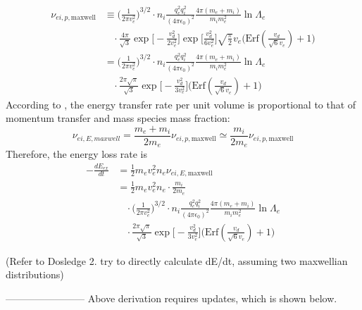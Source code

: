 \documentclass{article}
\begin{document}
\begin{equation}
	\begin{split}
		\nu_{ei,p,\text{maxwell}} &\equiv \Big(\frac{1}{2\pi v_e^2} \Big)^{3/2} \cdot n_i\frac{q_e^2 q_i^2}{(4\pi \epsilon_0 )^2}\frac{4\pi(m_e+m_i)}{m_i m_e^2} \ln \Lambda_e \\
		 &\ \ \ \ \cdot \frac{4\pi}{\sqrt{3}} \exp\Big[-\frac{v_d^2}{2v_e^2} \Big] \exp\Big[\frac{v_d^2}{6v_e^2} \Big]\sqrt{\frac{\pi}{2}}v_e \Big(\text{Erf}(\frac{v_d}{\sqrt{6}v_e} ) + 1 \Big) \\
		 &= \Big(\frac{1}{2\pi v_e^2} \Big)^{3/2} \cdot n_i\frac{q_e^2 q_i^2}{(4\pi \epsilon_0 )^2}\frac{4\pi(m_e+m_i)}{m_i m_e^2} \ln \Lambda_e \\
		 &\ \ \ \ \cdot \frac{2\pi\sqrt{\pi}}{\sqrt{3}}\exp\Big[-\frac{v_d^2}{3v_e^2} \Big] \Big(\text{Erf}(\frac{v_d}{\sqrt{6}v_e} ) + 1 \Big)	
	\end{split}
\end{equation}
According to \cite{Chen:2016it}, the energy transfer rate per unit volume is proportional to that of momentum transfer and mass species mass fraction:
\begin{equation}
	\nu_{ei,E,maxwell} = \frac{m_e + m_i}{2m_e} \nu_{ei,p,\text{maxwell}} \simeq \frac{m_i}{2m_e} \nu_{ei,p,\text{maxwell}}
\end{equation}
Therefore, the energy loss rate is
\begin{equation}
	\begin{split}
		-\frac{d E_{ex}}{d t} &= \frac{1}{2} m_e v_e^2 n_e \nu_{ei,E,\text{maxwell}} \\
		&= \frac{1}{2} m_e v_e^2 n_e \cdot \frac{m_i}{2m_e} \\
		&\ \ \ \ \cdot \Big(\frac{1}{2\pi v_e^2} \Big)^{3/2} \cdot n_i\frac{q_e^2 q_i^2}{(4\pi \epsilon_0 )^2}\frac{4\pi(m_e+m_i)}{m_i m_e^2} \ln \Lambda_e \\
		&\ \ \ \ \cdot \frac{2\pi\sqrt{\pi}}{\sqrt{3}}\exp\Big[-\frac{v_d^2}{3v_e^2} \Big] \Big(\text{Erf}(\frac{v_d}{\sqrt{6}v_e} ) + 1 \Big)
	\end{split}
\end{equation}

(Refer to Dosledge 2. try to directly calculate dE/dt, assuming two maxwellian distributions)

------------------------
\newline
{\color{red} Above derivation requires updates, which is shown below.}
\end{document}

